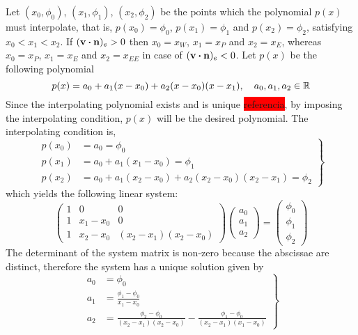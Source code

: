 \noindent
Let $(x_0, \phi_0)$, $(x_1, \phi_1)$, $(x_2, \phi_2)$ be the points which the polynomial $p(x)$ must interpolate, that is, $p(x_0) = \phi_0$, $p(x_1) = \phi_1$ and $p(x_2) = \phi_2$, satisfying $x_0 < x_1 < x_2$. If $(\vb{v} \vdot \vb{n})_e > 0$ then $x_0 = x_W$, $x_1 = x_P$ and $x_2 = x_E$, whereas $x_0 = x_P$, $x_1 = x_E$ and $x_2 = x_{EE}$ in case of $(\vb{v} \vdot \vb{n})_e < 0$. Let $p(x)$ be the following polynomial
\begin{equation}
	p(x) = a_0 + a_1 (x - x_0) + a_2 (x - x_0) (x - x_1), \quad a_0, a_1, a_2 \in \mathbb{R}
\end{equation}
Since the interpolating polynomial exists and is unique \colorbox{red}{referencia}, by imposing the interpolating condition, $p(x)$ will be the desired polynomial. The interpolating condition is,
\begin{equation}
	\left.
	\begin{aligned}
		p(x_0) &= a_0 = \phi_0 \\
		p(x_1) &= a_0 + a_1 (x_1 - x_0) = \phi_1 \\
		p(x_2) &= a_0 + a_1 (x_2 - x_0) + a_2 (x_2 - x_0) (x_2 - x_1) = \phi_2
	\end{aligned}	
	\right\}
\end{equation}
which yields the following linear system:
\begin{equation}
	\begin{pmatrix}
		1 & 0 & 0 \\
		1 & x_1 - x_0 & 0 \\
		1 & x_2 - x_0 & (x_2 - x_1)(x_2 - x_0)
	\end{pmatrix}
	\begin{pmatrix}
		a_0 \\ a_1 \\ a_2
	\end{pmatrix} = 
	\begin{pmatrix}
		\phi_0 \\ \phi_1 \\ \phi_2
	\end{pmatrix}
\end{equation}
The determinant of the system matrix is non-zero because the abscissae are distinct, therefore the system has a unique solution given by
\begin{equation}
	\left.
	\begin{aligned}
		a_0 &= \phi_0 \\
		a_1 &= \frac{\phi_1 - \phi_0}{x_1 - x_0} \\
		a_2 &= \frac{\phi_2 - \phi_0}{(x_2 - x_1)(x_2 - x_0)} - \frac{\phi_1 - \phi_0}{(x_2 - x_1)(x_1 - x_0)}
	\end{aligned}	
	\right\}
\end{equation}


